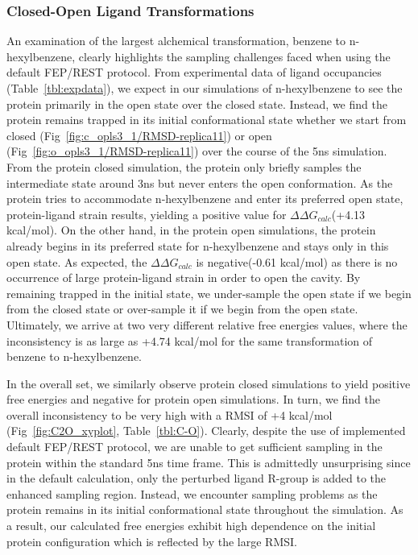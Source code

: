 \documentclass[journal=jctcce,manuscript=article]{achemso}
\begin{document}
\subsubsection*{Closed-Open Ligand Transformations}
An examination of the largest alchemical transformation, benzene to n-hexylbenzene, clearly highlights the sampling challenges faced when using the default FEP/REST protocol.
From experimental data of ligand occupancies (Table~\ref{tbl:expdata}), we expect in our simulations of n-hexylbenzene to see the protein primarily in the open state over the closed state.
Instead, we find the protein remains trapped in its initial conformational state whether we start from closed (Fig~\ref{fig:c_opls3_1/RMSD-replica11}) or open (Fig~\ref{fig:o_opls3_1/RMSD-replica11}) over the course of the 5ns simulation.
From the protein closed simulation, the protein only briefly samples the intermediate state around 3ns but never enters the open conformation.
As the protein tries to accommodate n-hexylbenzene and enter its preferred open state, protein-ligand strain results, yielding a positive value for $\Delta\Delta G_{calc}$(+4.13 kcal/mol).
On the other hand, in the protein open simulations, the protein already begins in its preferred state for n-hexylbenzene and stays only in this open state.
As expected, the $\Delta\Delta G_{calc}$ is negative(-0.61 kcal/mol) as there is no occurrence of large protein-ligand strain in order to open the cavity.
By remaining trapped in the initial state, we under-sample the open state if we begin from the closed state or over-sample it if we begin from the open state.
Ultimately, we arrive at two very different relative free energies values, where the inconsistency is as large as +4.74 kcal/mol for the same transformation of benzene to n-hexylbenzene.

In the overall set, we similarly observe protein closed simulations to yield positive free energies and negative for protein open simulations. 
In turn, we find the overall inconsistency to be very high with a RMSI of +4 kcal/mol (Fig~\ref{fig:C2O_xyplot}, Table~\ref{tbl:C-O}). 
Clearly, despite the use of implemented default FEP/REST protocol, we are unable to get sufficient sampling in the protein within the standard 5ns time frame.
This is admittedly unsurprising since in the default calculation, only the perturbed ligand R-group is added to the enhanced sampling region.  
Instead, we encounter sampling problems as the protein remains in its initial conformational state throughout the simulation. 
As a result, our calculated free energies exhibit high dependence on the initial protein configuration which is reflected by the large RMSI.
\end{document}

